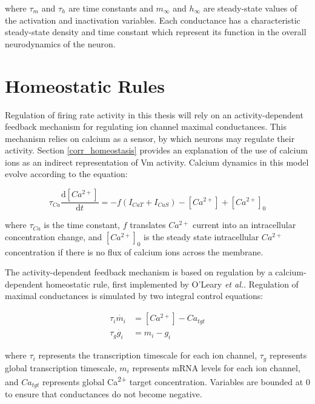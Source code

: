 where $\tau_m$ and $\tau_h$ are time constants and $m_\infty$ and $h_\infty$ are steady-state values of the activation and inactivation variables\cite{prinz_alternative_2003}. Each conductance has a characteristic steady-state density and time constant which represent its function in the overall neurodynamics of the neuron.

\section{Homeostatic Rules}\label{homeostaticrules}

Regulation of firing rate activity in this thesis will rely on an activity-dependent feedback mechanism for regulating ion channel maximal conductances\cite{oleary_correlations_2013,oleary_cell_2014,liu_model_1998,prinz_alternative_2003}.
This mechanism relies on calcium as a sensor, by which neurons may regulate their activity. Section \ref{corr_homeostasis} provides an explanation of the use of calcium ions as an indirect representation of \ac{Vm} activity.
Calcium dynamics in this model evolve according to the equation:

\begin{equation} \label{eq:calcium}
    \tau_{Ca} \frac{\mathrm{d}[Ca^{2+}]}{\mathrm{d}t} = -f(I_{CaT} + I_{CaS}) - [Ca^{2+}] + [Ca^{2+}]_0
\end{equation}

where $\tau_{Ca}$ is the time constant, $f$ translates $Ca^{2+}$ current into an intracellular concentration change, and $[Ca^{2+}]_0$ is the steady state intracellular $Ca^{2+}$ concentration if there is no flux of calcium ions across the membrane\cite{prinz_alternative_2003,liu_model_1998}.

The activity-dependent feedback mechanism is based on regulation by a calcium-dependent homeostatic rule, first implemented by O'Leary \textit{et al.}\cite{oleary_cell_2014}.
Regulation of maximal conductances is simulated by two integral control equations:

\begin{align} \label{eq:integralregulation}
    \tau_i \dot{m_i} &= [Ca^{2+}] - Ca_{tgt} \\
    \label{eq:integralregulation2}
    \tau_g \dot{g_i} &= m_i - g_i
\end{align}

where $\tau_i$ represents the transcription timescale for each ion channel, $\tau_g$ represents global transcription timescale, $m_i$ represents mRNA levels for each ion channel, and $Ca_{tgt}$ represents global Ca\textsuperscript{2+} target concentration. Variables are bounded at 0 to ensure that conductances do not become negative.

